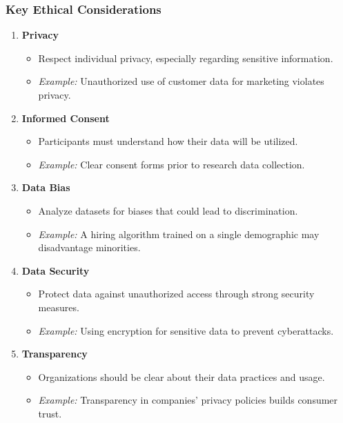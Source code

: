 \documentclass[aspectratio=169]{beamer}
\begin{document}
\begin{frame}[fragile]
    \frametitle{Key Ethical Considerations}
    
    \begin{enumerate}
        \item \textbf{Privacy} 
        \begin{itemize}
            \item Respect individual privacy, especially regarding sensitive information.
            \item \textit{Example:} Unauthorized use of customer data for marketing violates privacy.
        \end{itemize}
        
        \item \textbf{Informed Consent}
        \begin{itemize}
            \item Participants must understand how their data will be utilized.
            \item \textit{Example:} Clear consent forms prior to research data collection.
        \end{itemize}
        
        \item \textbf{Data Bias}
        \begin{itemize}
            \item Analyze datasets for biases that could lead to discrimination.
            \item \textit{Example:} A hiring algorithm trained on a single demographic may disadvantage minorities.
        \end{itemize}
        
        \item \textbf{Data Security}
        \begin{itemize}
            \item Protect data against unauthorized access through strong security measures.
            \item \textit{Example:} Using encryption for sensitive data to prevent cyberattacks.
        \end{itemize}
        
        \item \textbf{Transparency}
        \begin{itemize}
            \item Organizations should be clear about their data practices and usage.
            \item \textit{Example:} Transparency in companies' privacy policies builds consumer trust.
        \end{itemize}
    \end{enumerate}
\end{frame}
\end{document}
